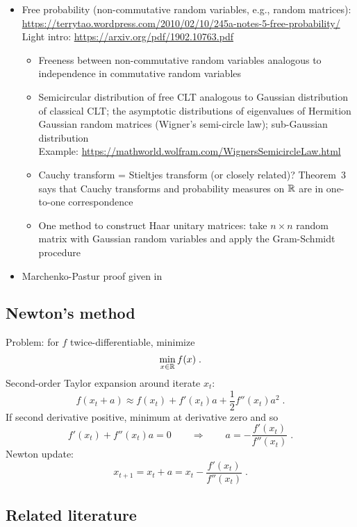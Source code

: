 \documentclass[10pt]{article}
\begin{document}
\begin{itemize}
\item
Free probability (non-commutative random variables, e.g., random matrices): \\
\url{https://terrytao.wordpress.com/2010/02/10/245a-notes-5-free-probability/} \\
Light intro: \url{https://arxiv.org/pdf/1902.10763.pdf} \citep{Xia:2019}
\begin{itemize}
\item
Freeness between non-commutative random variables analogous to independence in commutative random variables
\item
Semicircular distribution of free CLT analogous to Gaussian distribution of classical CLT; the asymptotic distributions of eigenvalues of Hermition Gaussian random matrices (Wigner's semi-circle law); sub-Gaussian distribution \\
Example: \url{https://mathworld.wolfram.com/WignersSemicircleLaw.html}
\item
Cauchy transform = Stieltjes transform (or closely related)? Theorem~3 says that Cauchy transforms and probability measures on $\mathbb{R}$ are in one-to-one correspondence
\item
One method to construct Haar unitary matrices: take $n\times n$ random matrix with \iid Gaussian random variables and apply the Gram-Schmidt procedure
\end{itemize}

\item
Marchenko-Pastur proof given in \citep{Couillet:2011}

\end{itemize}


\subsection{Newton's method}

Problem: for $f$ twice-differentiable, minimize
\[
\min_{x\in\mathbb{R}} f(x) \;.
\]
Second-order Taylor expansion around iterate $x_t$:
\[
f(x_t+a) \approx f(x_t) + f'(x_t)a + \frac{1}{2}f''(x_t)a^2 \;.
\]
If second derivative positive, minimum at derivative zero and so
\[
f'(x_t) + f''(x_t)a = 0 \qquad \Rightarrow\qquad a = -\frac{f'(x_t)}{f''(x_t)} \;.
\]
Newton update:
\[
x_{t+1} = x_t +a = x_t - \frac{f'(x_t)}{f''(x_t)} \;.
\]


\subsection{Related literature}
\end{document}
